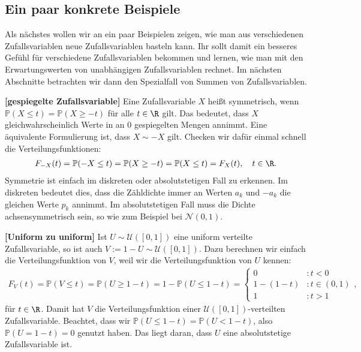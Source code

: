 \subsection{Ein paar konkrete Beispiele}
Als n\"achstes wollen wir an ein paar Beispielen zeigen, wie man aus verschiedenen Zufallsvariablen neue Zufallsvariablen basteln kann. Ihr sollt damit ein besseres Gef\"uhl f\"ur verschiedene Zufallsvariablen bekommen und lernen, wie man mit den Erwartungswerten von unabh\"angigen Zufallsvariablen rechnet. Im n\"achsten Abschnitte betrachten wir dann den Spezialfall von Summen von Zufallsvariablen.
\begin{beispiel}
 \textbf{[gespiegelte Zufallsvariable]}
	Eine Zufallsvariable $X$ hei\ss t symmetrisch, wenn $\mathbb P(X\leq t)=\mathbb P(X\geq -t)$ f\"ur alle $t\in\R$ gilt. Das bedeutet, dass $X$ gleichwahrscheinlich Werte in an $0$ gespiegelten Mengen annimmt. Eine \"aquivalente Formulierung ist, dass $X\sim -X$ gilt. Checken wir daf\"ur einmal schnell die Verteilungsfunktionen:
	\begin{align*}
		F_{-X}(t)=\mathbb P(-X\leq t)=\mathbb P(X\geq -t)=\mathbb P(X\leq t)=F_X(t),\quad t\in\R.
	\end{align*}
Symmetrie ist einfach im diskreten oder absolutstetigen Fall zu erkennen. Im diskreten bedeutet dies, dass die \glqq Z\"ahldichte\grqq{} immer an Werten $a_k$ und $-a_k$ die gleichen Werte $p_k$ annimmt. Im absolutstetigen Fall muss die Dichte achsensymmetrisch sein, so wie zum Beispiel bei $\mathcal N(0,1)$.


\end{beispiel}

\begin{beispiel}
 \textbf{[Uniform zu uniform]}
Ist $U\sim \mathcal U([0,1])$ eine uniform verteilte Zufallsvariable, so ist auch $V:=1-U\sim \mathcal U([0,1])$. Dazu berechnen wir einfach die Verteilungsfunktion von $V$, weil wir die Verteilungsfunktion von $U$ kennen:
\begin{align*}
	F_V(t)=\mathbb P(V\leq t)=\mathbb P(U\geq 1-t)=1-\mathbb P(U\leq 1-t)=
	\begin{cases}
	0&: t<0\\
	1-(1-t) &: t\in (0,1)\\
	1&:t>1
	\end{cases},
\end{align*}
f\"ur $t\in\R$. Damit hat $V$ die Verteilungsfunktion einer $\mathcal U([0,1])$-verteilten Zufallsvariable. Beachtet, dass wir $\mathbb P(U\leq 1-t)=\mathbb P(U<1-t)$, also $\mathbb P(U=1-t)=0$ genutzt haben. Das liegt daran, dass $U$ eine absolutstetige Zufallsvariable ist.
\end{beispiel}

